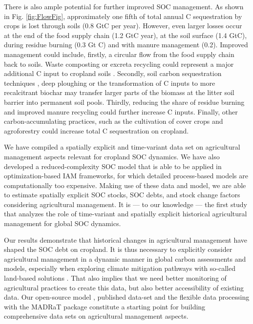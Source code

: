 \documentclass[gc, manuscript]{copernicus}
\begin{document}
There is also ample potential for further improved SOC management. As shown in Fig. \ref{fig:FlowFig}, approximately one fifth of total annual C sequestration by crops is lost through soils (0.8 GtC per year). However, even larger losses occur at the end of the food supply chain (1.2 GtC year), at the soil surface (1.4 GtC), during residue burning (0.3 Gt C) and with manure management (0.2). Improved management could include, firstly, a circular flow from the food supply chain back to soils. Waste composting or excreta recycling could represent a major additional C input to cropland soils \citep{brenzinger_organic_2018}. Secondly, soil carbon sequestration techniques \citep{smith_soil_2016}, deep ploughing \citep{alcantara_deep_2016} or the transformation of C inputs to more recalcitrant biochar \citep{woolf_sustainable_2010} may transfer larger parts of the biomass at the litter soil barrier into permanent soil pools. Thirdly, reducing the share of residue burning and improved manure recycling could further increase C inputs. Finally, other carbon-accumulating practices, such as the cultivation of cover crops \citep{poeplau_carbon_2015, porwollik_covercrops_2022} and agroforestry \citep{lorenz_soil_2014} could increase total C sequestration on cropland.
\newpage

\conclusions

We have compiled a spatially explicit and time-variant data set on agricultural management aspects relevant for cropland SOC dynamics. We have also developed a reduced-complexity SOC model that is able to be applied in optimization-based IAM frameworks, for which detailed process-based models are computationally too expensive. Making use of these data and model, we are able to estimate spatially explicit SOC stocks, SOC debts, and stock change factors considering agricultural management. It is --- to our knowledge --- the first study that analyzes the role of time-variant and spatially explicit historical agricultural management for global SOC dynamics.

Our results demonstrate that historical changes in agricultural management have shaped the SOC debt on cropland. It is thus necessary to explicitly consider agricultural management in a dynamic manner in global carbon assessments and models, especially when exploring climate mitigation pathways with so-called land-based solutions \citep[e.g.~][]{popp_land-use_2016}. That also implies that we need better monitoring of agricultural practices to create this data, but also better accessibility of existing data. Our open-source model \citep{karstens_mrsoil_2020}, published data-set \citep{karstens_model_2020} and the flexible data processing with the MADRaT package \citep{dietrich_madrat_2020} constitute a starting point for building comprehensive data sets on agricultural management aspects.
\end{document}
